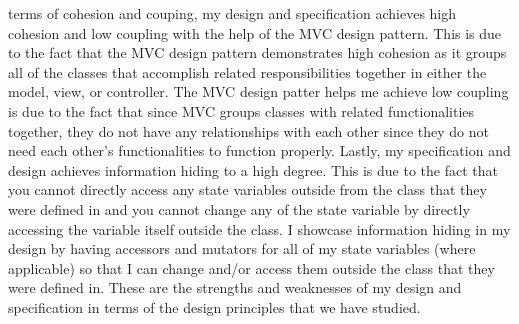\documentclass[12pt]{article}
\begin{document}
terms of cohesion and couping, my design and specification achieves high cohesion and low coupling with the help of the MVC design pattern. This is due to the fact that the MVC design pattern demonstrates high cohesion as it groups all of the classes that accomplish related responsibilities together in either the model, view, or controller. The MVC design patter helps me achieve low coupling is due to the fact that since MVC groups classes with related functionalities together, they do not have any relationships with each other since they do not need each other's functionalities to function properly. Lastly, my specification and design achieves information hiding to a high degree. This is due to the fact that you cannot directly access any state variables outside from the class that they were defined in and you cannot change any of the state variable by directly accessing the variable itself outside the class. I showcase information hiding in my design by having accessors and mutators for all of my state variables (where applicable) so that I can change and/or access them outside the class that they were defined in. These are the strengths and weaknesses of my design and specification in terms of the design principles that we have studied. \\
\end{document}
